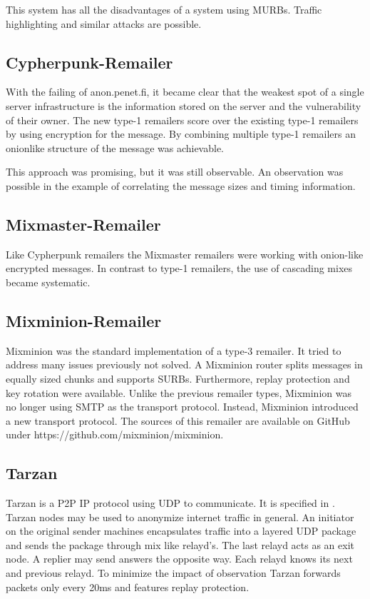 This system has all the disadvantages of a system using MURBs. Traffic highlighting and similar attacks are possible.

\subsection{Cypherpunk-Remailer\label{sec:remCypherpunk}}
With the failing of anon.penet.fi, it became clear that the weakest spot of a single server infrastructure is the information stored on the server and the vulnerability of their owner. The new type-1 remailers score over the existing type-1 remailers by using encryption for the message. By combining multiple type-1 remailers an onionlike structure of the message was achievable. 

This approach was promising, but it was still observable. An observation was possible in the example of correlating the message sizes and timing information.

\subsection{Mixmaster-Remailer\label{sec:remMixmaster}}
Like Cypherpunk remailers the Mixmaster remailers were working with onion-like encrypted messages. In contrast to type-1 remailers, the use of cascading mixes became systematic.

\subsection{Mixminion-Remailer\label{sec:remMixminion}}
Mixminion was the standard implementation of a type-3 remailer. It tried to address many issues previously not solved. A Mixminion router splits messages in equally sized chunks and supports SURBs. Furthermore,  replay protection and key rotation were available. Unlike the previous remailer types, Mixminion was no longer using SMTP as the transport protocol. Instead, Mixminion introduced a new transport protocol. The sources of this remailer are available on GitHub under https://github.com/mixminion/mixminion.

\subsection{Tarzan}
Tarzan is a P2P IP protocol using UDP to communicate. It is specified in \cite{tarzan:ccs02}. Tarzan nodes may be used to anonymize internet traffic in general. An initiator on the original sender machines encapsulates traffic into a layered UDP package and sends the package through mix like relayd's. The last relayd acts as an exit node. A replier may send answers the opposite way. Each relayd knows its next and previous relayd. To minimize the impact of observation Tarzan forwards packets only every 20ms and features replay protection.

